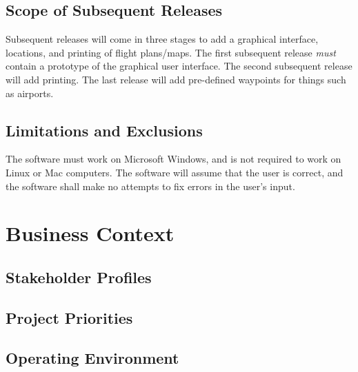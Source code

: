\documentclass[12pt, letterpaper]{article}
\begin{document}
\subsection{Scope of Subsequent Releases}
Subsequent releases will come in three stages to add a graphical interface, locations, and printing of flight plans/maps.
The first subsequent release \emph{must} contain a prototype of the graphical user interface.
The second subsequent release will add printing.
The last release will add pre-defined waypoints for things such as airports.

\subsection{Limitations and Exclusions}
The software must work on Microsoft Windows, and is not required to work on Linux or Mac computers.
The software will assume that the user is correct,
    and the software shall make no attempts to fix errors in the user's input.

\section{Business Context}
\subsection{Stakeholder Profiles}
\subsection{Project Priorities}
\subsection{Operating Environment}

{}

\end{document}
